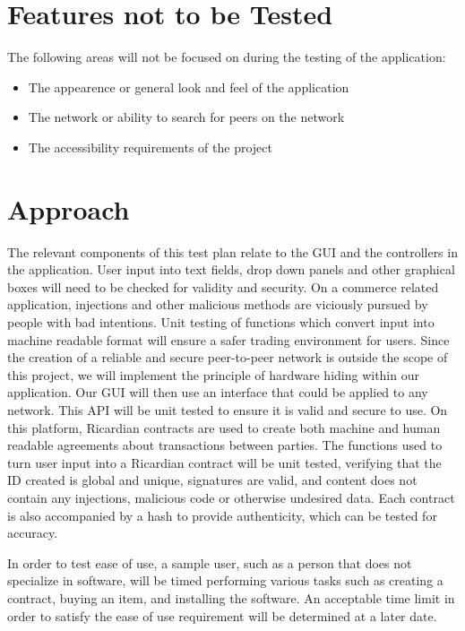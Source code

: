 \documentclass{article}
\begin{document}
\section*{Features not to be Tested}
The following areas will not be focused on during the testing of the application:
\newline
\begin{itemize}
 \item
The appearence or general look and feel of the application
 \item
The network or ability to search for peers on the network
\item
The accessibility requirements of the project
\end{itemize}

\section*{Approach}
The relevant components of this test plan relate to the GUI and the controllers in the application. User input into text fields, drop down panels and other graphical boxes will need to be checked for validity and security. On a commerce related application, injections and other malicious methods are viciously pursued by people with bad intentions. Unit testing of functions which convert input into machine readable format will ensure a safer trading environment for users. Since the creation of a reliable and secure peer-to-peer network is outside the scope of this project, we will implement the principle of hardware hiding within our application. Our GUI will then use an interface that could be applied to any network. This API will be unit tested to ensure it is valid and secure to use. On this platform, Ricardian contracts are used to create both machine and human readable agreements about transactions between parties. The functions used to turn user input into a Ricardian contract will be unit tested, verifying that the ID created is global and unique, signatures are valid, and content does not contain any injections, malicious code or otherwise undesired data. Each contract is also accompanied by a hash to provide authenticity, which can be tested for accuracy.

In order to test ease of use, a sample user, such as a person that does not specialize in software, will be timed performing various tasks such as creating a contract, buying an item, and installing the software. An acceptable time limit in order to satisfy the ease of use requirement will be determined at a later date.
\end{document}
